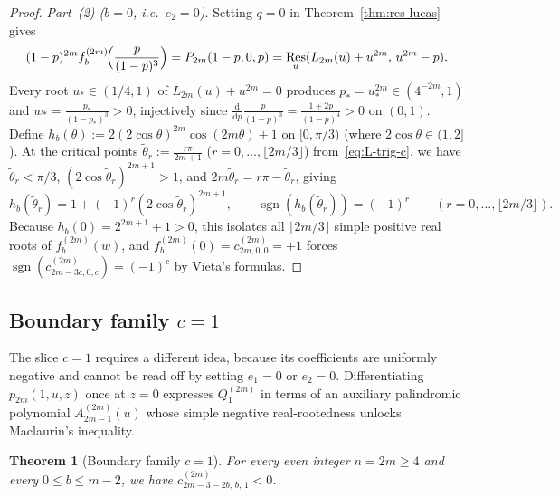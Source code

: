 \documentclass[10pt]{article}
\numberwithin{equation}{section}
\theoremstyle{plain}
\newtheorem{theorem}{Theorem}[section]
\theoremstyle{definition}
\newcommand{\dd}{\mathrm{d}}
\newcommand{\1}{\mathbf{1}}
\DeclareMathOperator{\sgn}{sgn}
\DeclareMathOperator{\Res}{Res}
\begin{document}
\begin{proof}
\emph{Part~(2) ($b = 0$, i.e.\ $e_2 = 0$).} Setting $q = 0$ in Theorem~\ref{thm:res-lucas} gives
\[
(1 - p)^{2m} f_b^{(2m)}\!\Bigl(\frac{p}{(1 - p)^3}\Bigr) = P_{2m}(1 - p, 0, p) = \Res_u(L_{2m}(u) + u^{2m},\, u^{2m} - p).
\]
Every root $u_* \in (1/4, 1)$ of $L_{2m}(u) + u^{2m} = 0$ produces $p_* = u_*^{2m} \in (4^{-2m}, 1)$ and $w_* = \frac{p_*}{(1-p_*)^3} > 0$, injectively since $\frac{\dd}{\dd p}\frac{p}{(1-p)^3} = \frac{1+2p}{(1-p)^4} > 0$ on $(0, 1)$. Define $h_b(\theta) := 2(2\cos\theta)^{2m}\cos(2m\theta) + 1$ on $[0, \pi/3)$ (where $2\cos\theta \in (1, 2]$). At the critical points $\tilde{\theta}_r := \frac{r\pi}{2m + 1}$ ($r = 0, \dots, \lfloor 2m/3 \rfloor$) from~\eqref{eq:L-trig-c}, we have $\tilde{\theta}_r < \pi/3$, $(2\cos\tilde{\theta}_r)^{2m+1} > 1$, and $2m\tilde{\theta}_r = r\pi - \tilde{\theta}_r$, giving
\[
h_b(\tilde{\theta}_r) = 1 + (-1)^r (2\cos\tilde{\theta}_r)^{2m+1}, \qquad \sgn(h_b(\tilde{\theta}_r)) = (-1)^r \qquad (r = 0, \dots, \lfloor 2m/3 \rfloor).
\]
Because $h_b(0) = 2^{2m+1} + 1 > 0$, this isolates all $\lfloor 2m/3 \rfloor$ simple positive real roots of $f_b^{(2m)}(w)$, and $f_b^{(2m)}(0) = c_{2m,0,0}^{(2m)} = +1$ forces $\sgn(c_{2m-3c, 0, c}^{(2m)}) = (-1)^c$ by Vieta's formulas.
\end{proof}

\subsection{Boundary family \texorpdfstring{$c = 1$}{c = 1}}
\label{sec:bdy-c1}

The slice $c = 1$ requires a different idea, because its coefficients are uniformly negative and cannot be read off by setting $e_1 = 0$ or $e_2 = 0$. Differentiating $p_{2m}(1, u, z)$ once at $z = 0$ expresses $Q_1^{(2m)}$ in terms of an auxiliary palindromic polynomial $A_{2m-1}^{(2m)}(u)$ whose simple negative real-rootedness unlocks Maclaurin's inequality.

\begin{theorem}[Boundary family $c = 1$]\label{thm:bdy-c1}
For every even integer $n = 2m \ge 4$ and every $0 \le b \le m - 2$, we have $c_{2m-3-2b,\, b,\, 1}^{(2m)} < 0$.
\end{theorem}
\end{document}

